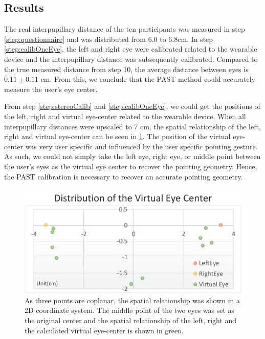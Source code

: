 \subsection{Results} \label{sec:3-PAST:results}
The real interpupillary distance of the ten participants was measured in step \ref{step:questionnaire} and was distributed from 6.0 to 6.8cm. In step \ref{step:calibOneEye}, the left and right eye were calibrated related to the wearable device and the interpupillary distance was subsequently calibrated. Compared to the true measured distance from step 10, the average distance between eyes is $0.11\pm0.11$ cm. From this, we conclude that the PAST method could accurately measure the user's eye center. 

From step \ref{step:stereoCalib} and \ref{step:calibOneEye}, we could get the positions of the left, right and virtual eye-center related to the wearable device. When all interpupillary distances were upscaled to 7 cm, the spatial relationship of the left, right and virtual eye-center can be seen in \figurename{ \ref{fig:3-PAST:virtualEye}}. 
The position of the virtual eye-center was very user specific and influenced by the user specific pointing gesture. As such, we could not simply take the left eye, right eye, or middle point between the user's eyes as the virtual eye center to recover the pointing geometry. Hence, the PAST calibration is necessary to recover an accurate pointing geometry.
\begin{figure}[htb] 
	\centering
	\includegraphics[width=\linewidth]{figures/3-PAST/virtualEye.png}
	\caption{As three points are coplanar, the spatial relationship was shown in a 2D coordinate system. The middle point of the two eyes was set as the original center and the spatial relationship of the left, right and the calculated virtual eye-center is shown in green.}
	\label{fig:3-PAST:virtualEye}
\end{figure}

